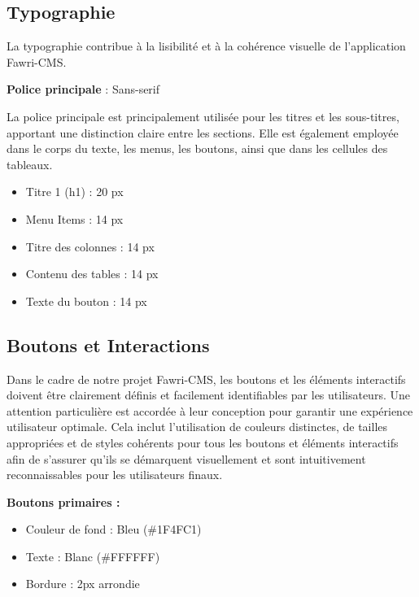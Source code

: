 \subsection{Typographie}
\hspace{\parindent}La typographie contribue à la lisibilité et à la cohérence visuelle de l'application Fawri-CMS.

\textbf{Police principale} : Sans-serif

La police principale est principalement utilisée pour les titres et les sous-titres, apportant une distinction claire entre les sections. Elle est également employée dans le corps du texte, les menus, les boutons, ainsi que dans les cellules des tableaux.

\begin{itemize}
    \item Titre 1 (h1) : 20 px

    \item Menu Items : 14 px

    \item Titre des colonnes : 14 px

    \item Contenu des tables : 14 px

    \item Texte du bouton : 14 px
\end{itemize}










\subsection{Boutons et Interactions}
\hspace{\parindent}Dans le cadre de notre projet Fawri-CMS, les boutons et les éléments interactifs doivent être clairement définis et facilement identifiables par les utilisateurs. Une attention particulière est accordée à leur conception pour garantir une expérience utilisateur optimale. Cela inclut l'utilisation de couleurs distinctes, de tailles appropriées et de styles cohérents pour tous les boutons et éléments interactifs afin de s'assurer qu'ils se démarquent visuellement et sont intuitivement reconnaissables pour les utilisateurs finaux.

\textbf{Boutons primaires :}
\begin{itemize}
    \item Couleur de fond : Bleu (\#1F4FC1)

    \item Texte : Blanc (\#FFFFFF)

    \item Bordure : 2px arrondie
\end{itemize}

